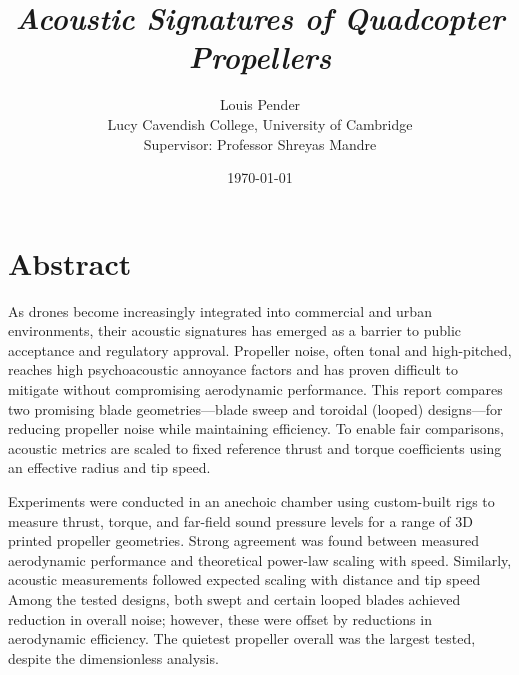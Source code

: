 \documentclass[12pt,a4paper]{article}
\title{\vspace{-2cm} \textit{Acoustic Signatures of Quadcopter Propellers}}
\author{Louis Pender \\
        Lucy Cavendish College, University of Cambridge \\
        Supervisor: Professor Shreyas Mandre
        }
\date{\today}
\begin{document}
\maketitle

\thispagestyle{empty} %

\section*{Abstract}


As drones become increasingly integrated into commercial and urban environments,
their acoustic signatures has emerged as a barrier to public acceptance and regulatory approval.
Propeller noise, often tonal and high-pitched, reaches high psychoacoustic annoyance factors and has proven difficult to mitigate without compromising aerodynamic performance.
This report compares two promising blade geometries—blade sweep and toroidal (looped) designs—for reducing propeller noise while maintaining efficiency.
To enable fair comparisons, acoustic metrics are scaled to fixed reference thrust and torque coefficients using an effective radius and tip speed.

Experiments were conducted in an anechoic chamber using custom-built rigs to measure thrust, torque, and far-field sound pressure levels for a range of 3D printed propeller geometries.
Strong agreement was found between measured aerodynamic performance and theoretical power-law scaling with speed.
Similarly, acoustic measurements followed expected scaling with distance and tip speed
Among the tested designs, both swept and certain looped blades achieved reduction in overall noise;
however, these were offset by reductions in aerodynamic efficiency.
The quietest propeller overall was the largest tested, despite the dimensionless analysis.

\newpage
\tableofcontents
\end{document}
